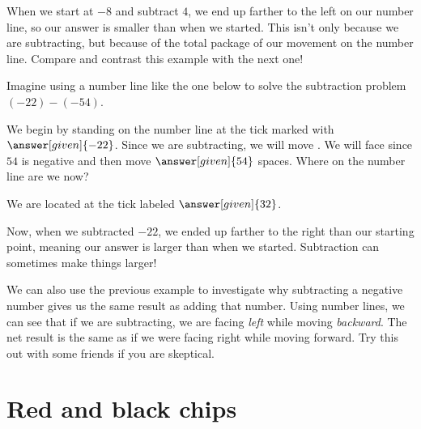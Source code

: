 \documentclass{ximera}
\begin{document}
When we start at $-8$ and subtract $4$, we end up farther to the left on our number line, so our answer is smaller than when we started. This isn't only because we are subtracting, but because of the total package of our movement on the number line. Compare and contrast this example with the next one!


\begin{example}
Imagine using a number line like the one below to solve the subtraction problem $(-22) - (-54)$.
\begin{center}
\end{center}
We begin by standing on the number line at the tick marked with $\answer[given]{-22}$.  Since we 
are subtracting, we will move .  We 
will face  since $54$ is negative and then move 
$\answer[given]{54}$ spaces.  Where on the number line are we now? 

\begin{prompt}
We are located at the tick labeled $\answer[given]{32}$.
\end{prompt}
\end{example}

Now, when we subtracted $-22$, we ended up farther to the right than our starting point, meaning our answer is larger than when we started. Subtraction can sometimes make things larger!


We can also use the previous example to investigate why subtracting a negative number gives us the same result as adding that number.  Using 
number lines, we can see that if we are subtracting, we are facing {\em left} while moving
{\em backward}.  The net result is the same as if we were facing right while moving forward. 
Try this out with some friends if you are skeptical.


\section{Red and black chips}
\end{document}
